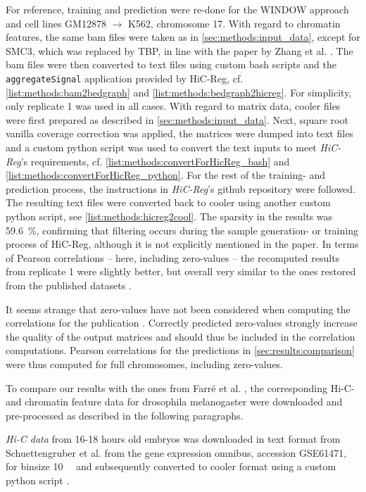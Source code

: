 For reference, training and prediction were re-done for the WINDOW approach and cell lines GM12878 $\rightarrow$ K562, chromosome 17.
With regard to chromatin features, the same bam files were taken as in \cref{sec:methods:input_data}, except for SMC3, which was replaced by TBP,
in line with the paper by Zhang et al. \cite{Zhang2019}. 
The bam files were then converted to text files using custom bash scripts and the \texttt{aggregateSignal} application provided by HiC-Reg, 
cf. \cref{list:methods:bam2bedgraph} and \ref{list:methods:bedgraph2hicreg}. 
For simplicity, only replicate 1 was used in all cases.
With regard to matrix data, cooler files were first prepared as described in \cref{sec:methods:input_data}.
Next, square root vanilla coverage correction was applied, the matrices were dumped into text files and a custom python script was used
to convert the text inputs to meet \emph{HiC-Reg}'s requirements, cf. \cref{list:methods:convertForHicReg_bash} and \ref{list:methods:convertForHicReg_python}.
For the rest of the training- and prediction process, the instructions in \emph{HiC-Reg}'s github repository were followed.
The resulting text files were converted back to cooler using another custom python script, see \cref{list:methods:hicreg2cool}.
The sparsity in the results was \SI{59.6}{\percent}, confirming that filtering occurs during the sample generation- or training process of HiC-Reg,
although it is not explicitly mentioned in the paper.
In terms of Pearson correlations -- here, including zero-values -- the recomputed results from replicate 1 were slightly better,
but overall very similar to the ones restored from the published datasets \cite{ShiluZhang2019,ShiluZhang2019a}. 

It seems strange that zero-values have not been considered when computing the correlations for the publication \cite{Zhang2019}.
Correctly predicted zero-values strongly increase the quality of the output matrices 
and should thus be included in the correlation computations.
Pearson correlations for the predictions in \cref{sec:results:comparison} were thus computed for full chromosomes, including zero-values.

To compare our results with the ones from Farr\'e et al. \cite{Farre2018a},
the corresponding Hi-C- and chromatin feature data for drosophila melanogaster were downloaded and pre-processed as described in the following paragraphs.

\emph{Hi-C data} from 16-18 hours old embryos was downloaded in text format from Schuettengruber et al. \cite{Schuettengruber2014} 
from the gene expression omnibus, accession GSE61471, for binsize \SI{10}{\kilo\bp} and subsequently converted to cooler format using a custom python script \cite[scripts/schuettengruberToCooler.py]{Krauth2021b}.

